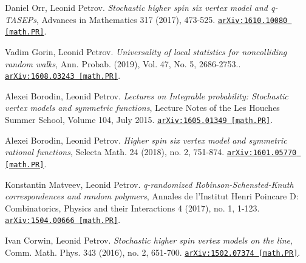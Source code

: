 \documentclass[letterpaper,11pt]{article}
\begin{document}
\begin{etaremune}
	
	
	
	
	
	
	
	
	
	
	
	
	
	
	
	
	\item 
	Daniel Orr, Leonid Petrov.
	\emph{Stochastic higher spin six vertex model and q-TASEPs}, Advances in Mathematics 317 (2017), 473-525. 
	\href{https://arxiv.org/abs/1610.10080}{\texttt{arXiv:1610.10080 [math.PR]}}.
	
	
	
	
	
	
	
	
	
	\item 
	Vadim Gorin, Leonid Petrov.
	\emph{Universality of local statistics for noncolliding random walks}, Ann. Probab. (2019), Vol. 47, No. 5, 2686-2753.. 
	\href{https://arxiv.org/abs/1608.03243}{\texttt{arXiv:1608.03243 [math.PR]}}.
	
	
	
	\item 
	Alexei Borodin, Leonid Petrov.
	\emph{Lectures on Integrable probability: Stochastic vertex models and symmetric functions}, Lecture Notes of the Les Houches Summer School, Volume 104, July 2015. 
	\href{https://arxiv.org/abs/1605.01349}{\texttt{arXiv:1605.01349 [math.PR]}}.
	
	
	
	\item 
	Alexei Borodin, Leonid Petrov.
	\emph{Higher spin six vertex model and symmetric rational functions}, Selecta Math. 24 (2018), no. 2, 751-874. 
	\href{https://arxiv.org/abs/1601.05770}{\texttt{arXiv:1601.05770 [math.PR]}}.
	
	
	
	
	
	
	
	
	
	\item 
	Konstantin Matveev, Leonid Petrov.
	\emph{q-randomized Robinson-Schensted-Knuth correspondences and random polymers}, Annales de l’Institut Henri Poincare D: Combinatorics, Physics and their Interactions 4 (2017), no. 1, 1-123. 
	\href{https://arxiv.org/abs/1504.00666}{\texttt{arXiv:1504.00666 [math.PR]}}.
	
	
	
	
	
	\item 
	Ivan Corwin, Leonid Petrov.
	\emph{Stochastic higher spin vertex models on the line}, Comm. Math. Phys. 343 (2016), no. 2, 651-700. 
	\href{https://arxiv.org/abs/1502.07374}{\texttt{arXiv:1502.07374 [math.PR]}}.
	

\end{etaremune}
\end{document}
